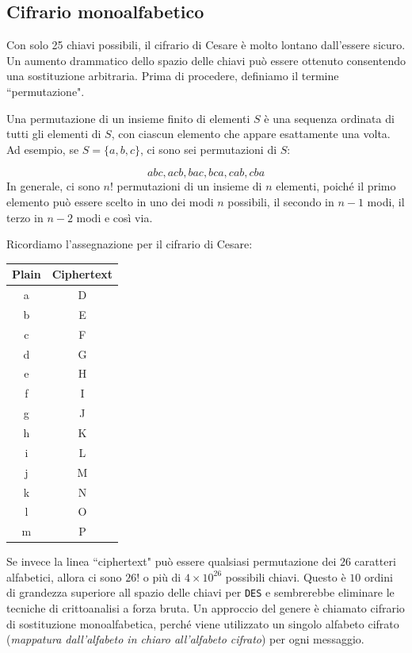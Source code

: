 \subsection{Cifrario  monoalfabetico}
Con solo 25 chiavi possibili, il cifrario di Cesare è molto lontano
dall'essere sicuro. Un aumento drammatico dello spazio delle chiavi
può essere ottenuto consentendo una sostituzione arbitraria. Prima
di procedere, definiamo il termine ``permutazione".
\begin{tcolorbox}[title = {Permutazione}]
Una permutazione di un insieme finito di elementi $S$ è una
sequenza ordinata di tutti gli elementi di $S$, con ciascun elemento
che appare esattamente una volta. Ad esempio, se $S = \{a, b, c\}$, ci
sono sei permutazioni di $S$:
\end{tcolorbox}
\[
abc, acb, bac, bca, cab, cba
\]
In generale, ci sono $n!$ permutazioni di un insieme
di $n$ elementi, poiché il primo elemento può essere scelto in uno
dei modi $n$ possibili, il secondo in $n - 1$ modi, il terzo
in $n - 2$ modi e così via.

Ricordiamo l'assegnazione per il cifrario di Cesare:
\begin{center}
\begin{tabular}{|c|c|}
\hline
\textbf{Plain} & \textbf{Ciphertext} \\
\hline
a & D \\
b & E \\
c & F \\
d & G \\
e & H \\
f & I \\
g & J \\
h & K \\
i & L \\
j & M \\
k & N \\
l & O \\
m & P \\
\hline
\end{tabular}
\end{center}

Se invece la linea ``ciphertext" può essere qualsiasi permutazione
dei $26$ caratteri alfabetici, allora ci sono $26!$ o più di $4 \times 10^{26}$
possibili chiavi. Questo è $10$ ordini di grandezza superiore all
spazio delle chiavi per \verb|DES| e sembrerebbe eliminare le tecniche di
crittoanalisi a forza bruta. Un approccio del genere è chiamato
cifrario di sostituzione monoalfabetica, perché viene utilizzato
un singolo alfabeto cifrato (\textit{mappatura dall'alfabeto in chiaro
all'alfabeto cifrato}) per ogni messaggio.


